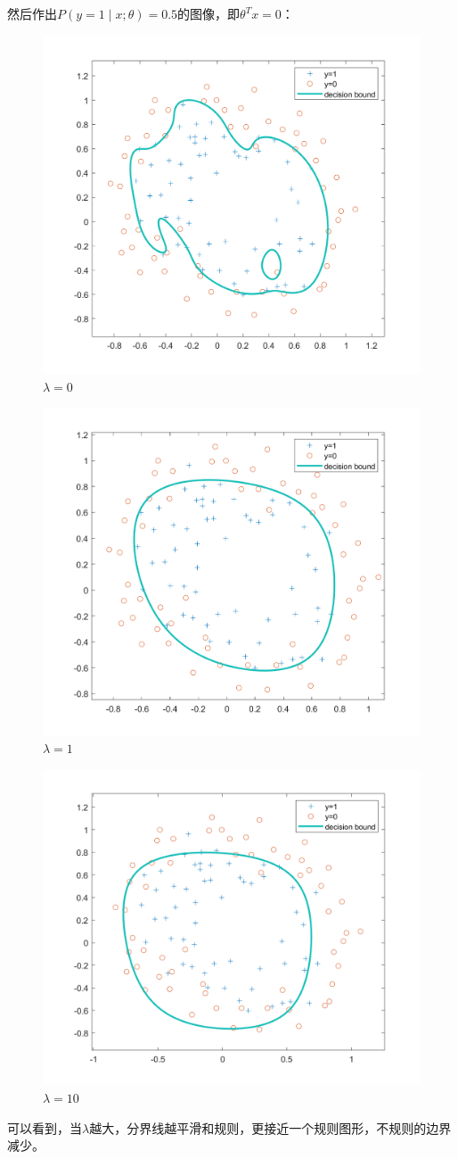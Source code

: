 \documentclass{article}
\begin{document}
然后作出$P(y=1\;|\;x;\theta)=0.5$的图像，即$\theta^Tx=0$：
\begin{figure}[h]
    \centering
    \includegraphics[width=0.5\linewidth]{lambda=0.png}
    \caption{$\lambda=0$}
\end{figure}
\begin{figure}[h]
    \centering
    \includegraphics[width=0.5\linewidth]{lambda=1.png}
    \caption{$\lambda=1$}
\end{figure}
\begin{figure}[h]
    \centering
    \includegraphics[width=0.5\linewidth]{lambda=10.png}
    \caption{$\lambda=10$}
\end{figure}




可以看到，当$\lambda$越大，分界线越平滑和规则，更接近一个规则图形，不规则的边界减少。
\end{document}
